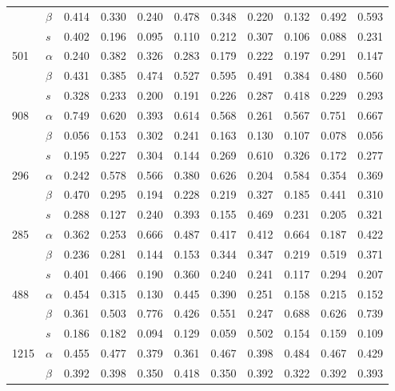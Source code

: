\begin{longtable}{llrrrrrrrrr}
     & $\beta$ & 0.414 & 0.330 & 0.240 & 0.478 & 0.348 & 0.220 & 0.132 & 0.492 & 0.593 \\
     & $s$ & 0.402 & 0.196 & 0.095 & 0.110 & 0.212 & 0.307 & 0.106 & 0.088 & 0.231 \\
\cline{1-11}
\multirow{3}{*}{501} & $\alpha$ & 0.240 & 0.382 & 0.326 & 0.283 & 0.179 & 0.222 & 0.197 & 0.291 & 0.147 \\
     & $\beta$ & 0.431 & 0.385 & 0.474 & 0.527 & 0.595 & 0.491 & 0.384 & 0.480 & 0.560 \\
     & $s$ & 0.328 & 0.233 & 0.200 & 0.191 & 0.226 & 0.287 & 0.418 & 0.229 & 0.293 \\
\cline{1-11}
\multirow{3}{*}{908} & $\alpha$ & 0.749 & 0.620 & 0.393 & 0.614 & 0.568 & 0.261 & 0.567 & 0.751 & 0.667 \\
     & $\beta$ & 0.056 & 0.153 & 0.302 & 0.241 & 0.163 & 0.130 & 0.107 & 0.078 & 0.056 \\
     & $s$ & 0.195 & 0.227 & 0.304 & 0.144 & 0.269 & 0.610 & 0.326 & 0.172 & 0.277 \\
\cline{1-11}
\multirow{3}{*}{296} & $\alpha$ & 0.242 & 0.578 & 0.566 & 0.380 & 0.626 & 0.204 & 0.584 & 0.354 & 0.369 \\
     & $\beta$ & 0.470 & 0.295 & 0.194 & 0.228 & 0.219 & 0.327 & 0.185 & 0.441 & 0.310 \\
     & $s$ & 0.288 & 0.127 & 0.240 & 0.393 & 0.155 & 0.469 & 0.231 & 0.205 & 0.321 \\
\cline{1-11}
\multirow{3}{*}{285} & $\alpha$ & 0.362 & 0.253 & 0.666 & 0.487 & 0.417 & 0.412 & 0.664 & 0.187 & 0.422 \\
     & $\beta$ & 0.236 & 0.281 & 0.144 & 0.153 & 0.344 & 0.347 & 0.219 & 0.519 & 0.371 \\
     & $s$ & 0.401 & 0.466 & 0.190 & 0.360 & 0.240 & 0.241 & 0.117 & 0.294 & 0.207 \\
\cline{1-11}
\multirow{3}{*}{488} & $\alpha$ & 0.454 & 0.315 & 0.130 & 0.445 & 0.390 & 0.251 & 0.158 & 0.215 & 0.152 \\
     & $\beta$ & 0.361 & 0.503 & 0.776 & 0.426 & 0.551 & 0.247 & 0.688 & 0.626 & 0.739 \\
     & $s$ & 0.186 & 0.182 & 0.094 & 0.129 & 0.059 & 0.502 & 0.154 & 0.159 & 0.109 \\
\cline{1-11}
\multirow{3}{*}{1215} & $\alpha$ & 0.455 & 0.477 & 0.379 & 0.361 & 0.467 & 0.398 & 0.484 & 0.467 & 0.429 \\
     & $\beta$ & 0.392 & 0.398 & 0.350 & 0.418 & 0.350 & 0.392 & 0.322 & 0.392 & 0.393 \\

\end{longtable}
